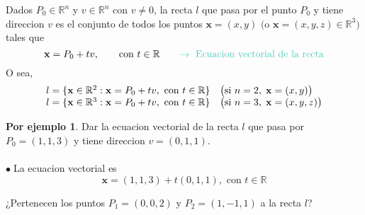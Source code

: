 \documentclass{article}
\theoremstyle{definition}
\newtheorem*{ej}{Por ejemplo}
\theoremstyle{remark}
\newcommand\bl{$\bullet\;$}
\begin{document}
\begin{defi}
  Dados $P_0 \in \mathbb{R}^n$ y $v \in \mathbb{R}^n$ con $v \neq 0$, la recta $l$ que pasa por el punto $P_0$ y tiene direccion $v$ es el conjunto de todos los puntos $\mathbf{x}=(x,y)$  $\big(\text{o } \mathbf{x}=(x,y,z) \in \mathbb{R}^3\big)$ tales que \[
    \mathbf{x} = P_0 + tv, \quad \quad \text{con } t \in \mathbb{R} \quad \quad \textcolor{verdep2}{\rightarrow \text{ Ecuacion vectorial de la recta}}
  \]
  O sea, \[\begin{array}{l}
    l = \{\mathbf{x} \in \mathbb{R}^2 : \mathbf{x} = P_0 + tv, \text{ con } t \in \mathbb{R} \} \quad \big(\text{si $n=2, \; \mathbf{x}=(x,y)$}\big) \\ 
    l = \{ \mathbf{x} \in \mathbb{R}^3 : \mathbf{x} = P_0 + tv, \text{ con } t \in \mathbb{R}\} \quad \big($\text{si $n=3, \; \mathbf{x}=(x,y,z)$}$\big)
    \end{array} \]
\end{defi}
\pagebreak
\begin{ej}
  Dar la ecuacion vectorial de la recta $l$ que pasa por $P_0 =(1,1,3)$ y tiene direccion $v=(0,1,1)$. \\\\ 
  \bl La ecuacion vectorial es \[ 
    \mathbf{x}=(1,1,3)+t(0,1,1), \text{ con } t \in \mathbb{R}
  \]
\end{ej}
\begin{figure}[h]
\centering
\def\svgwidth{0.75\textwidth}

\end{figure}

¿Pertenecen los puntos $P_1 = (0,0,2)$ y $P_2 = (1,-1,1)$ a la recta $l$?  \\
\end{document}
